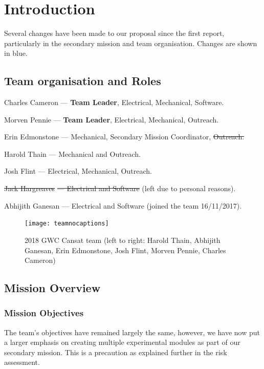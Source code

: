 \documentclass{report}
\begin{document}
\begin{description}
	\end{description}

	\chapter{Introduction}
	Several changes have been made to our proposal since the first report, 
	particularly in the secondary mission and team organisation. 
	Changes are shown in blue.
	\section{Team organisation and Roles}
		\begin{description}
			\item{Charles Cameron} --- \textbf{Team Leader}, Electrical, 
			Mechanical, Software.
			\item{Morven Pennie} --- \textbf{Team Leader}, Electrical,
			Mechanical, Outreach.
			\item{Erin Edmonstone} --- Mechanical, 
			{\color{blue}Secondary Mission Coordinator, \sout{Outreach.}}
			\item{Harold Thain} --- Mechanical and Outreach.
			\item{Josh Flint} --- Electrical, Mechanical, Outreach.
			\color{blue}
			\item{\sout{Jack Hargreaves}}\sout{ --- Electrical and Software} (left
			due to personal reasons).
			\item{Abhijith Ganesan} --- Electrical and Software (joined the team 
			16/11/2017).
	 	\end{description}

		\begin{figure}[H]
			\begin{center}
				\texttt{[image: teamnocaptions]}
			\end{center}
			\vspace{-12pt}
			\caption{2018 GWC Cansat team (left to right: Harold Thain, Abhijith Ganesan, Erin Edmonstone, Josh Flint, Morven Pennie, Charles Cameron)}
		\end{figure}

	
	\section{Mission Overview}
		\subsection{Mission Objectives}
		The team's objectives have remained largely the same, however, we have
		now put a larger emphasis on creating multiple experimental modules as part
		of our secondary mission. This is a precaution as explained further in the
		risk assessment.
\end{document}
